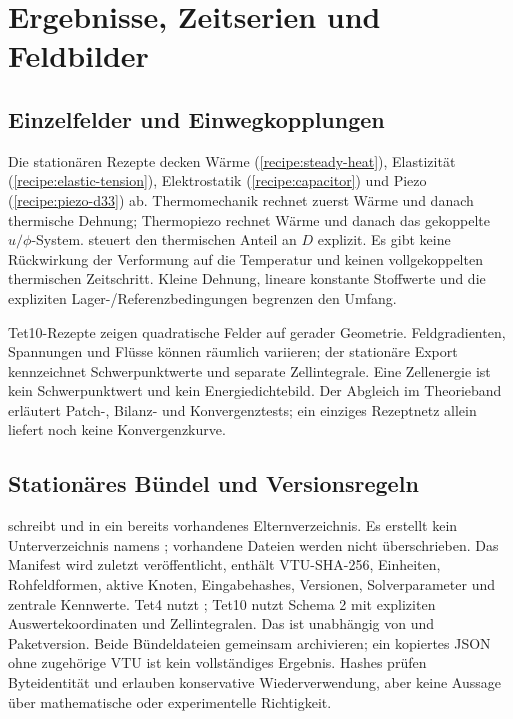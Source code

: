 \chapter{Ergebnisse, Zeitserien und Feldbilder}\label{sec:app-results}
\section{Einzelfelder und Einwegkopplungen}
Die stationären Rezepte decken Wärme (\ref{recipe:steady-heat}),
Elastizität (\ref{recipe:elastic-tension}), Elektrostatik
(\ref{recipe:capacitor}) und Piezo (\ref{recipe:piezo-d33}) ab.
Thermomechanik rechnet zuerst Wärme und danach thermische Dehnung;
Thermopiezo rechnet Wärme und danach das gekoppelte $u/\phi$-System.
 steuert den thermischen Anteil an $D$ explizit.
Es gibt keine Rückwirkung der Verformung auf die Temperatur und keinen
vollgekoppelten thermischen Zeitschritt. Kleine Dehnung, lineare konstante
Stoffwerte und die expliziten Lager-/Referenzbedingungen begrenzen den Umfang.

Tet10-Rezepte zeigen quadratische Felder auf gerader Geometrie. Feldgradienten,
Spannungen und Flüsse können räumlich variieren; der stationäre Export
kennzeichnet Schwerpunktwerte und separate Zellintegrale. Eine Zellenergie
ist kein Schwerpunktwert und kein Energiedichtebild. Der Abgleich im
Theorieband erläutert Patch-, Bilanz- und Konvergenztests; ein einziges
Rezeptnetz allein liefert noch keine Konvergenzkurve.

\section{Stationäres Bündel und Versionsregeln}
 schreibt
 und  in ein bereits vorhandenes
Elternverzeichnis. Es erstellt kein Unterverzeichnis namens ;
vorhandene Dateien werden nicht überschrieben. Das Manifest wird zuletzt
veröffentlicht, enthält VTU-SHA-256, Einheiten, Rohfeldformen, aktive Knoten,
Eingabehashes, Versionen, Solverparameter und zentrale Kennwerte.
Tet4 nutzt ; Tet10 nutzt Schema 2 mit
expliziten Auswertekoordinaten und Zellintegralen. Das ist unabhängig von
 und Paketversion. Beide Bündeldateien gemeinsam
archivieren; ein kopiertes JSON ohne zugehörige VTU ist kein vollständiges
Ergebnis. Hashes prüfen Byteidentität und erlauben konservative Wiederverwendung,
aber keine Aussage über mathematische oder experimentelle Richtigkeit.

